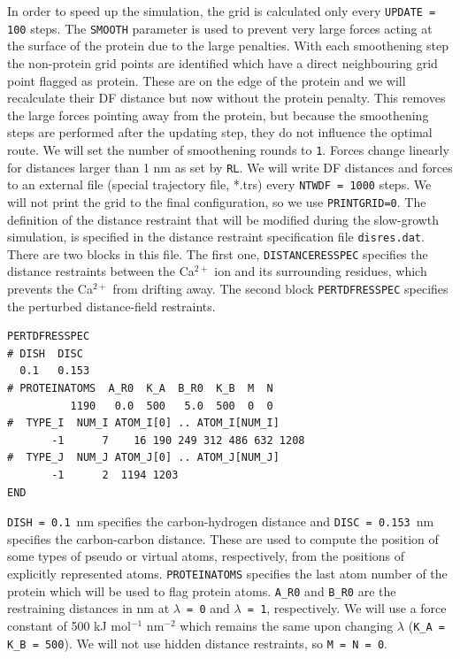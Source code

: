 In order to speed up the simulation, the grid is calculated only every \texttt{UPDATE = 100} steps. 
The \texttt{SMOOTH} parameter is used to prevent very large forces acting at the surface of the protein due to the large penalties. 
With each smoothening step the non-protein grid points are identified which have a direct neighbouring grid point flagged as protein. 
These are on the edge of the protein and we will recalculate their DF distance but now without the protein penalty. 
This removes the large forces pointing away from the protein, but because the smoothening steps are performed after the updating step, they do not influence the optimal route. 
We will set the number of smoothening rounds to \texttt{1}. Forces change linearly for distances larger than 1 nm as set by \texttt{RL}. 
We will write DF distances and forces to an external file (special trajectory file, *.trs) every \texttt{NTWDF = 1000} steps. We will not print the grid to the final configuration, so we use \texttt{PRINTGRID=0}. 
The definition of the distance restraint that will be modified during the slow-growth simulation, is specified in the distance restraint specification file \texttt{disres.dat}. 
There are two blocks in this file. 
The first one, \texttt{DISTANCERESSPEC} specifies the distance restraints between the Ca$^{2+}$ ion and its surrounding residues, which prevents the Ca$^{2+}$ from drifting away. 
The second block \texttt{PERTDFRESSPEC} specifies the perturbed distance-field restraints. 
\begin{lstlisting}
PERTDFRESSPEC
# DISH  DISC
  0.1   0.153
# PROTEINATOMS  A_R0  K_A  B_R0  K_B  M  N
          1190   0.0  500   5.0  500  0  0
#  TYPE_I  NUM_I ATOM_I[0] .. ATOM_I[NUM_I]
       -1      7    16 190 249 312 486 632 1208
#  TYPE_J  NUM_J ATOM_J[0] .. ATOM_J[NUM_J]
       -1      2  1194 1203
END
\end{lstlisting}
\texttt{DISH = 0.1}~nm specifies the carbon-hydrogen distance and \texttt{DISC = 0.153}~nm specifies the carbon-carbon distance. %
These are used to compute the position of some types of pseudo or virtual atoms, respectively, from the positions of explicitly represented atoms.
\texttt{PROTEINATOMS} specifies the last atom number of the protein which will be used to flag protein atoms. 
\texttt{A\_R0} and \texttt{B\_R0} are the restraining distances in nm at \texttt{$\lambda$ = 0} and \texttt{$\lambda$ = 1}, respectively. 
We will use a force constant of 500 kJ mol$^{-1}$ nm$^{-2}$ which remains the same upon changing $\lambda$ (\texttt{K\_A = K\_B = 500}). 
We will not use hidden distance restraints, so \texttt{M = N = 0}. 

